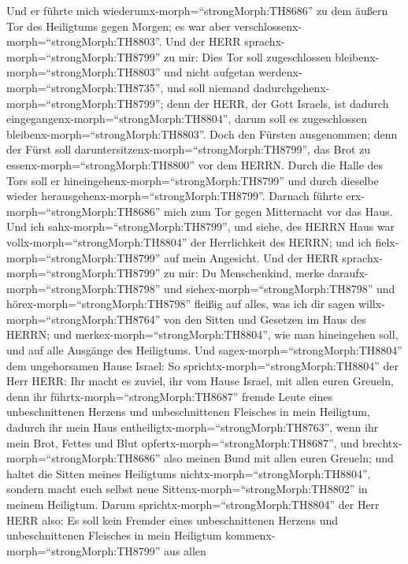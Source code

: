  Und er führte mich wiederumx-morph=``strongMorph:TH8686''
zu dem äußern Tor des Heiligtums gegen Morgen; es war aber
verschlossenx-morph=``strongMorph:TH8803''.  Und der HERR
sprachx-morph=``strongMorph:TH8799'' zu mir: Dies Tor soll zugeschlossen
bleibenx-morph=``strongMorph:TH8803'' und nicht aufgetan
werdenx-morph=``strongMorph:TH8735'', und soll niemand
dadurchgehenx-morph=``strongMorph:TH8799''; denn der HERR, der Gott
Israels, ist dadurch eingegangenx-morph=``strongMorph:TH8804'', darum
soll es zugeschlossen bleibenx-morph=``strongMorph:TH8803''.
 Doch den Fürsten ausgenommen; denn der Fürst soll
daruntersitzenx-morph=``strongMorph:TH8799'', das Brot zu
essenx-morph=``strongMorph:TH8800'' vor dem HERRN. Durch die Halle des
Tors soll er hineingehenx-morph=``strongMorph:TH8799'' und durch
dieselbe wieder herausgehenx-morph=``strongMorph:TH8799''. 
Darnach führte erx-morph=``strongMorph:TH8686'' mich zum Tor gegen
Mitternacht vor das Haus. Und ich sahx-morph=``strongMorph:TH8799'', und
siehe, des HERRN Haus war vollx-morph=``strongMorph:TH8804'' der
Herrlichkeit des HERRN; und ich fielx-morph=``strongMorph:TH8799'' auf
mein Angesicht.  Und der HERR
sprachx-morph=``strongMorph:TH8799'' zu mir: Du Menschenkind, merke
daraufx-morph=``strongMorph:TH8798'' und
siehex-morph=``strongMorph:TH8798'' und
hörex-morph=``strongMorph:TH8798'' fleißig auf alles, was ich dir sagen
willx-morph=``strongMorph:TH8764'' von den Sitten und Gesetzen im Haus
des HERRN; und merkex-morph=``strongMorph:TH8804'', wie man hineingehen
soll, und auf alle Ausgänge des Heiligtums.  Und
sagex-morph=``strongMorph:TH8804'' dem ungehorsamen Hause Israel: So
sprichtx-morph=``strongMorph:TH8804'' der Herr HERR: Ihr macht es
zuviel, ihr vom Hause Israel, mit allen euren Greueln,  denn
ihr führtx-morph=``strongMorph:TH8687'' fremde Leute eines
unbeschnittenen Herzens und unbeschnittenen Fleisches in mein Heiligtum,
dadurch ihr mein Haus entheiligtx-morph=``strongMorph:TH8763'', wenn ihr
mein Brot, Fettes und Blut opfertx-morph=``strongMorph:TH8687'', und
brechtx-morph=``strongMorph:TH8686'' also meinen Bund mit allen euren
Greueln;  und haltet die Sitten meines Heiligtums
nichtx-morph=``strongMorph:TH8804'', sondern macht euch selbst neue
Sittenx-morph=``strongMorph:TH8802'' in meinem Heiligtum. 
Darum sprichtx-morph=``strongMorph:TH8804'' der Herr HERR also: Es soll
kein Fremder eines unbeschnittenen Herzens und unbeschnittenen Fleisches
in mein Heiligtum kommenx-morph=``strongMorph:TH8799'' aus allen
